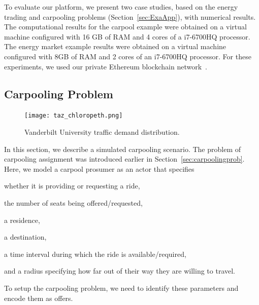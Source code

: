 



To evaluate our platform, we present two case studies, based on the energy trading and carpooling problems (Section~\ref{sec:ExaApp}), with numerical results. 
%
The computational results for the carpool example were obtained on a virtual machine configured with 16 GB of RAM and 4 cores of a i7-6700HQ processor. The energy market example results were obtained on a virtual machine configured with 8GB of RAM and 2 cores of an i7-6700HQ processor. For these experiments, we used
 our private Ethereum blockchain network~\cite{EthereumBook}. 

\subsection{Carpooling Problem}
\label{sec:carpool}

\ifExtended
\begin{figure}[t]
\begin{center}
\centerline{\texttt{[image: taz\_chloropeth.png]}}
\caption{Vanderbilt University traffic demand distribution.}
\label{fig:demand_dist}
\end{center}
\vspace{-0.3in}
\end{figure}
\fi




In this section, we describe a simulated carpooling scenario. The problem of carpooling assignment was introduced earlier in Section~\ref{sec:carpoolingprob}.
Here, we model a carpool prosumer as an actor that specifies
\begin{enumerate*}
    \item whether it is providing or requesting a ride,
    \item the number of seats being offered/requested,
    \item a residence,
    \item a destination,
    \item a time interval during which the ride is available/required,
    \item and a radius specifying how far out of their way they are willing to travel.
\end{enumerate*}
To setup the carpooling problem, we need to identify these parameters and encode them as offers. 

